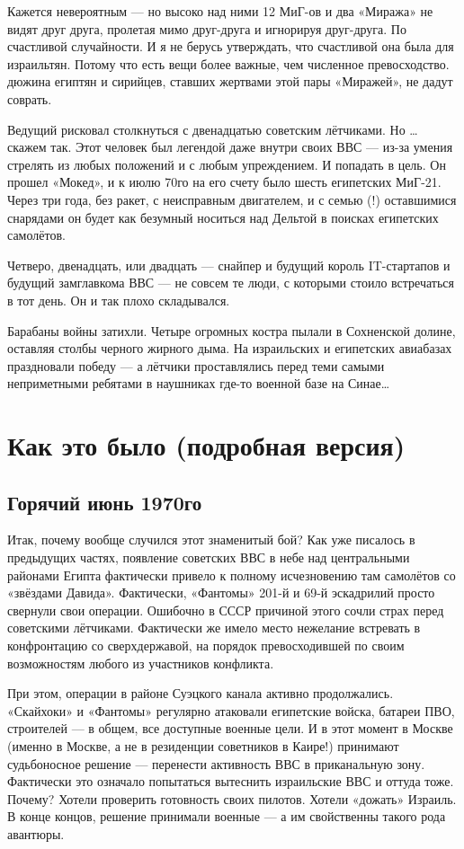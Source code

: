 Кажется невероятным — но высоко над ними 12 МиГ-ов и два «Миража» не видят друг друга, пролетая мимо друг-друга и игнорируя друг-друга. По счастливой случайности. И я не берусь утверждать, что счастливой она была для израильтян. Потому что есть вещи более важные, чем численное превосходство. дюжина египтян и сирийцев, ставших жертвами этой пары «Миражей», не дадут соврать.

Ведущий рисковал столкнуться с двенадцатью советским лётчиками. Но … скажем так. Этот человек был легендой даже внутри своих ВВС — из-за умения стрелять из любых положений и с любым упреждением. И попадать в цель. Он прошел «Мокед», и к июлю 70го на его счету было шесть египетских МиГ-21. Через три года, без ракет, с неисправным двигателем, и с семью (!) оставшимися снарядами он будет как безумный носиться над Дельтой в поисках египетских самолётов.

Четверо, двенадцать, или двадцать — снайпер и будущий король IT-стартапов и будущий замглавкома ВВС — не совсем те люди, с которыми стоило встречаться в тот день. Он и так плохо складывался.

Барабаны войны затихли. Четыре огромных костра пылали в Сохненской долине, оставляя столбы черного жирного дыма. На израильских и египетских авиабазах праздновали победу — а лётчики проставлялись перед теми самыми неприметными ребятами в наушниках где-то военной базе на Синае…

\section{Как это было (подробная версия)}

\subsection{Горячий июнь 1970го}

Итак, почему вообще случился этот знаменитый бой? Как уже писалось в предыдущих частях, появление советских ВВС в небе над центральными районами Египта фактически привело к полному исчезновению там самолётов со «звёздами Давида». Фактически, «Фантомы» 201-й и 69-й эскадрилий просто свернули свои операции. Ошибочно в СССР причиной этого сочли страх перед советскими лётчиками. Фактически же имело место нежелание встревать в конфронтацию со сверхдержавой, на порядок превосходившей по своим возможностям любого из участников конфликта.

При этом, операции в районе Суэцкого канала активно продолжались. «Скайхоки» и «Фантомы» регулярно атаковали египетские войска, батареи ПВО, строителей — в общем, все доступные военные цели. И в этот момент в Москве (именно в Москве, а не в резиденции советников в Каире!) принимают судьбоносное решение — перенести активность ВВС в приканальную зону. Фактически это означало попытаться вытеснить израильские ВВС и оттуда тоже. Почему? Хотели проверить готовность своих пилотов. Хотели «дожать» Израиль. В конце концов, решение принимали военные — а им свойственны такого рода авантюры.

